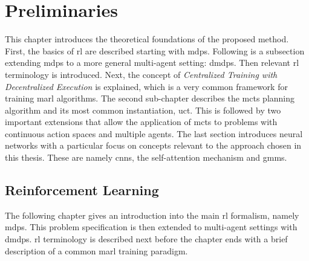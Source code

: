 \glsresetall
\section{Preliminaries}\label{sec:preliminaries}
This chapter introduces the theoretical foundations of the proposed method. First, the basics of \gls{rl} are described starting with \glspl{mdp}. Following is a subsection extending \glspl{mdp} to a more general multi-agent setting: \glspl{dmdp}. Then relevant \gls{rl} terminology is introduced. Next, the concept of \emph{Centralized Training with Decentralized Execution} is explained, which is a very common framework for training \gls{marl} algorithms. The second sub-chapter describes the \gls{mcts} planning algorithm and its most common instantiation, \gls{uct}. This is followed by two important extensions that allow the application of \gls{mcts} to problems with continuous action spaces and multiple agents. The last section introduces neural networks with a particular focus on concepts relevant to the approach chosen in this thesis. These are namely \glspl{cnn}, the self-attention mechanism and \glspl{gmm}.

\subsection{Reinforcement Learning}\label{ssec:rl}
The following chapter gives an introduction into the main \gls{rl} formalism, namely \glspl{mdp}. This problem specification is then extended to multi-agent settings with \glspl{dmdp}. \gls{rl} terminology is described next before the chapter ends with a brief description of a common \gls{marl} training paradigm.

